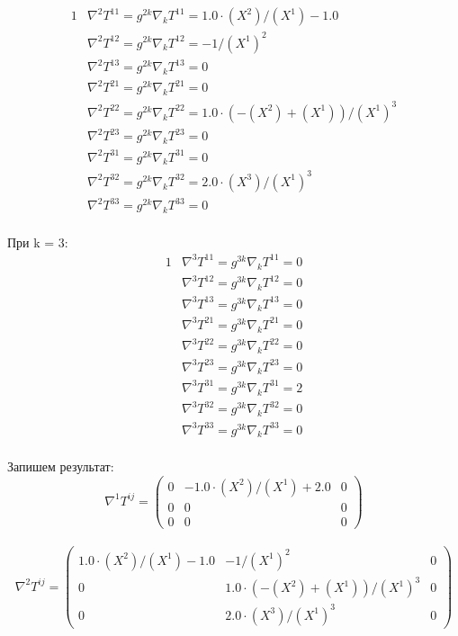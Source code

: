 \documentclass[a4paper, 12pt, oneside]{article}
\begin{document}
\begin{alignat*}{1}
  & \nabla^2T^{11} = g^{2k}\nabla_kT^{11} = 1.0\cdot (X^2)/(X^1) - 1.0 \\
  & \nabla^2T^{12} = g^{2k}\nabla_kT^{12} = -1/(X^1)^2 \\
  & \nabla^2T^{13} = g^{2k}\nabla_kT^{13} = 0 \\
  & \nabla^2T^{21} = g^{2k}\nabla_kT^{21} = 0 \\
  & \nabla^2T^{22} = g^{2k}\nabla_kT^{22} = 1.0\cdot (-(X^2) + (X^1))/(X^1)^3 \\
  & \nabla^2T^{23} = g^{2k}\nabla_kT^{23} = 0 \\
  & \nabla^2T^{31} = g^{2k}\nabla_kT^{31} = 0 \\
  & \nabla^2T^{32} = g^{2k}\nabla_kT^{32} = 2.0\cdot (X^3)/(X^1)^3 \\
  & \nabla^2T^{33} = g^{2k}\nabla_kT^{33} = 0 
\end{alignat*}\\
При k = 3:\\
\begin{alignat*}{1}
  & \nabla^3T^{11} = g^{3k}\nabla_kT^{11} = 0 \\
  & \nabla^3T^{12} = g^{3k}\nabla_kT^{12} = 0 \\
  & \nabla^3T^{13} = g^{3k}\nabla_kT^{13} = 0 \\
  & \nabla^3T^{21} = g^{3k}\nabla_kT^{21} = 0 \\
  & \nabla^3T^{22} = g^{3k}\nabla_kT^{22} = 0 \\
  & \nabla^3T^{23} = g^{3k}\nabla_kT^{23} = 0 \\
  & \nabla^3T^{31} = g^{3k}\nabla_kT^{31} = 2 \\
  & \nabla^3T^{32} = g^{3k}\nabla_kT^{32} = 0 \\
  & \nabla^3T^{33} = g^{3k}\nabla_kT^{33} = 0 
\end{alignat*}\\
Запишем результат:\\
\[
\nabla^1T^{ij} = \begin{pmatrix}
	0 & -1.0\cdot (X^2)/(X^1) + 2.0 & 0\\
	0 & 0 & 0\\
	0 & 0 & 0
\end{pmatrix}
\]\\
\[
\nabla^2T^{ij} = \begin{pmatrix}
	1.0\cdot (X^2)/(X^1) - 1.0 & -1/(X^1)^2 & 0\\
	0 & 1.0\cdot (-(X^2) + (X^1))/(X^1)^3 & 0\\
	0 & 2.0\cdot (X^3)/(X^1)^3 & 0
\end{pmatrix}
\]\\
\end{document}
